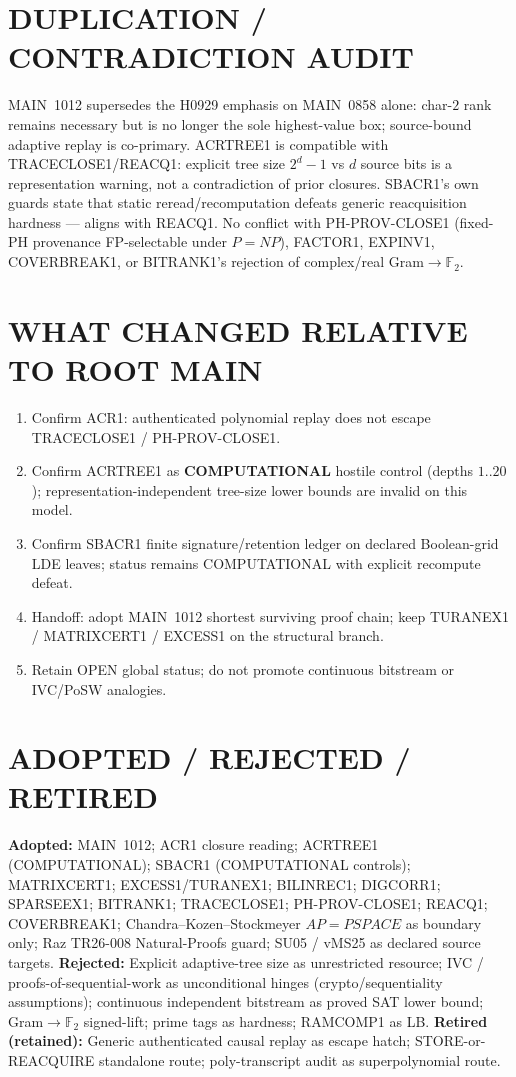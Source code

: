 \documentclass[11pt]{article}
\begin{document}
\section*{DUPLICATION / CONTRADICTION AUDIT}
MAIN~1012 supersedes the H0929 emphasis on MAIN~0858 alone: char-$2$ rank remains necessary
but is no longer the sole highest-value box; source-bound adaptive replay is co-primary.
ACRTREE1 is compatible with TRACECLOSE1/REACQ1: explicit tree size $2^d-1$ vs $d$ source bits
is a representation warning, not a contradiction of prior closures.
SBACR1's own guards state that static reread/recomputation defeats generic reacquisition
hardness --- aligns with REACQ1.
No conflict with PH-PROV-CLOSE1 (fixed-PH provenance FP-selectable under $P=NP$),
FACTOR1, EXPINV1, COVERBREAK1, or BITRANK1's rejection of complex/real Gram$\to\mathbb F_2$.

\section*{WHAT CHANGED RELATIVE TO ROOT MAIN}
\begin{enumerate}
\item Confirm ACR1: authenticated polynomial replay does not escape TRACECLOSE1 /
PH-PROV-CLOSE1.
\item Confirm ACRTREE1 as \textbf{COMPUTATIONAL} hostile control (depths $1..20$);
representation-independent tree-size lower bounds are invalid on this model.
\item Confirm SBACR1 finite signature/retention ledger on declared Boolean-grid LDE leaves;
status remains COMPUTATIONAL with explicit recompute defeat.
\item Handoff: adopt MAIN~1012 shortest surviving proof chain; keep TURANEX1 / MATRIXCERT1 /
EXCESS1 on the structural branch.
\item Retain OPEN global status; do not promote continuous bitstream or IVC/PoSW analogies.
\end{enumerate}

\section*{ADOPTED / REJECTED / RETIRED}
\textbf{Adopted:} MAIN~1012; ACR1 closure reading; ACRTREE1 (COMPUTATIONAL); SBACR1
(COMPUTATIONAL controls); MATRIXCERT1; EXCESS1/TURANEX1; BILINREC1; DIGCORR1; SPARSEEX1;
BITRANK1; TRACECLOSE1; PH-PROV-CLOSE1; REACQ1; COVERBREAK1; Chandra--Kozen--Stockmeyer
$AP=PSPACE$ as boundary only; Raz TR26-008 Natural-Proofs guard; SU05 / vMS25 as declared
source targets.
\textbf{Rejected:} Explicit adaptive-tree size as unrestricted resource; IVC / proofs-of-sequential-work
as unconditional hinges (crypto/sequentiality assumptions); continuous independent bitstream as
proved SAT lower bound; Gram$\to\mathbb F_2$ signed-lift; prime tags as hardness; RAMCOMP1 as LB.
\textbf{Retired (retained):} Generic authenticated causal replay as escape hatch; STORE-or-REACQUIRE
standalone route; poly-transcript audit as superpolynomial route.
\end{document}
